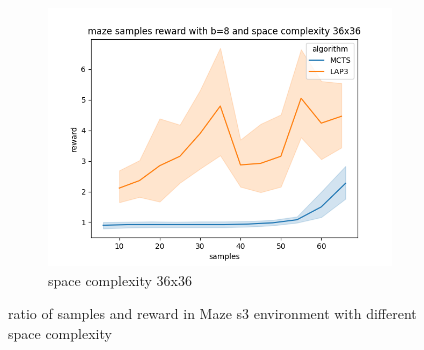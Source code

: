 \documentclass[bibliography=totoc]{scrartcl}
\begin{document}
\begin{figure}[h!]
\begin{subfigure}[b]{0.3\linewidth}
		\includegraphics[width=\linewidth]{img/maze_samples__reward_b_8_LAP3_MCTS_36.png}
        \caption{space complexity 36x36}
	\end{subfigure}
	\caption{ratio of samples and reward in Maze s3 environment with different space complexity}
	\label{fig:known_problems}
\end{figure}
\end{document}
